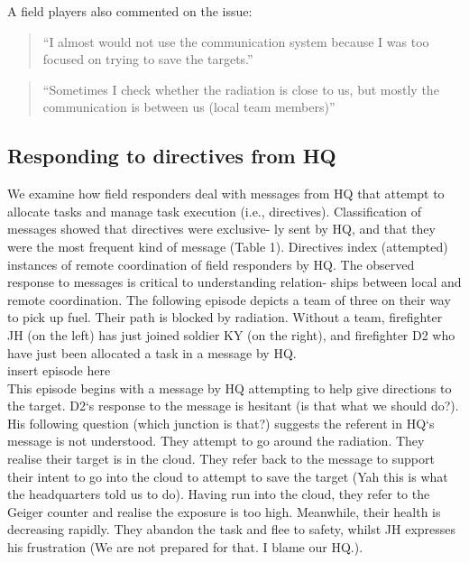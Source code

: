 A field players also commented on the issue:\\

\begin{quote}
``I almost would not use the communication system because I was too focused on trying to save the targets.''
\end{quote}

\begin{quote}
``Sometimes I check whether the radiation is close to us, but mostly the communication is between us (local team members)''
\end{quote}


\subsection{Responding to directives from HQ}

We examine how field responders deal with messages from HQ that attempt to allocate tasks and manage task execution (i.e., directives). Classification of messages showed that directives were exclusive- ly sent by HQ, and that they were the most frequent kind of message (Table 1). Directives index (attempted) instances of remote coordination of field responders by HQ. The observed response to messages is critical to understanding relation- ships between local and remote coordination. The following episode depicts a team of three on their way to pick up fuel. Their path is blocked by radiation. Without a team, firefighter JH (on the left) has just joined soldier KY (on the right), and firefighter D2 who have just been allocated a task in a message by HQ.\\

insert episode here\\

This episode begins with a message by HQ attempting to help give directions to the target. D2`s response to the message is hesitant (is that what we should do?). His following question (which junction is that?) suggests the referent in HQ`s message is not understood. They attempt to go around the radiation. They realise their target is in the cloud. They refer back to the message to support their intent to go into the cloud to attempt to save the target (Yah this is what the headquarters told us to do). Having run into the cloud, they refer to the Geiger counter and realise the exposure is too high. Meanwhile, their health is decreasing rapidly. They abandon the task and flee to safety, whilst JH expresses his frustration (We are not prepared for that. I blame our HQ.).\\

